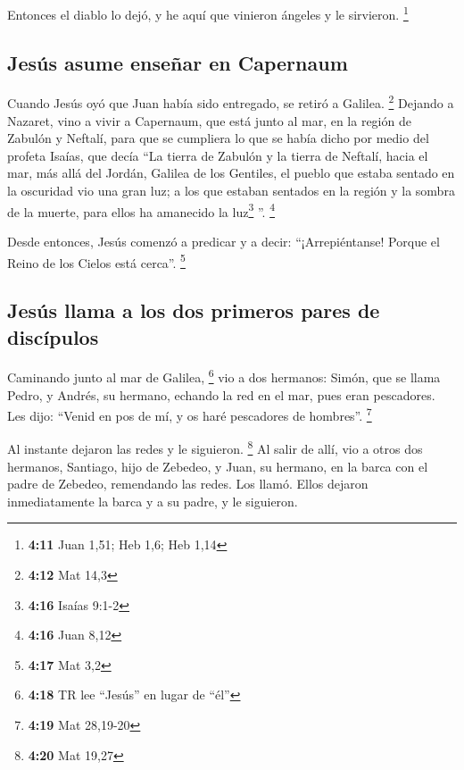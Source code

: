 \begin{paracol}{2}
 Entonces el diablo lo dejó, y he aquí que vinieron
ángeles y le sirvieron. \footnote{\textbf{4:11} Juan 1,51; Heb 1,6; Heb
  1,14}

\hypertarget{jesuxfas-asume-enseuxf1ar-en-capernaum}{%
\subsection{Jesús asume enseñar en
Capernaum}\label{jesuxfas-asume-enseuxf1ar-en-capernaum}}

 Cuando Jesús oyó que Juan había sido entregado, se
retiró a Galilea. \footnote{\textbf{4:12} Mat 14,3} 
Dejando a Nazaret, vino a vivir a Capernaum, que está junto al mar, en
la región de Zabulón y Neftalí,  para que se cumpliera lo
que se había dicho por medio del profeta Isaías, que decía
 ``La tierra de Zabulón y la tierra de Neftalí, hacia el
mar, más allá del Jordán, Galilea de los Gentiles,  el
pueblo que estaba sentado en la oscuridad vio una gran luz; a los que
estaban sentados en la región y la sombra de la muerte, para ellos ha
amanecido la luz\footnote{\textbf{4:16} Isaías 9:1-2} ''. \footnote{\textbf{4:16}
  Juan 8,12}

 Desde entonces, Jesús comenzó a predicar y a decir:
``¡Arrepiéntanse! Porque el Reino de los Cielos está cerca''.
\footnote{\textbf{4:17} Mat 3,2}

\hypertarget{jesuxfas-llama-a-los-dos-primeros-pares-de-discuxedpulos}{%
\subsection{Jesús llama a los dos primeros pares de
discípulos}\label{jesuxfas-llama-a-los-dos-primeros-pares-de-discuxedpulos}}

 Caminando junto al mar de Galilea, \footnote{\textbf{4:18}
  TR lee ``Jesús'' en lugar de ``él''} vio a dos hermanos: Simón, que se
llama Pedro, y Andrés, su hermano, echando la red en el mar, pues eran
pescadores.  Les dijo: ``Venid en pos de mí, y os haré
pescadores de hombres''. \footnote{\textbf{4:19} Mat 28,19-20}

 Al instante dejaron las redes y le siguieron.
\footnote{\textbf{4:20} Mat 19,27}  Al salir de allí, vio
a otros dos hermanos, Santiago, hijo de Zebedeo, y Juan, su hermano, en
la barca con el padre de Zebedeo, remendando las redes. Los llamó.
 Ellos dejaron inmediatamente la barca y a su padre, y le
siguieron.


\end{paracol}
